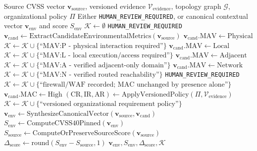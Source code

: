 \begin{algorithm}[H]
\caption{Evidence-Grounded CVSS v4.0 Environmental Metric Inference}
\label{alg:metric_inference}
\begin{algorithmic}[1]
\footnotesize
\Require Source CVSS vector $\mathbf{v}_{\text{source}}$, versioned evidence $\mathcal{V}_{\text{evidence}}$, topology graph $\mathcal{G}$, organizational policy $\Pi$
\Ensure Either \texttt{HUMAN\_REVIEW\_REQUIRED}, or canonical contextual vector $\mathbf{v}_{\text{env}}$ and score $S_{\text{env}}$
\State $\mathcal{K} \gets \emptyset$
    \State \Return \texttt{HUMAN\_REVIEW\_REQUIRED}
\EndIf
\State $\mathbf{v}_{\text{cand}} \gets \text{ExtractCandidateEnvironmentalMetrics}(\mathbf{v}_{\text{source}})$
    \State $\mathbf{v}_{\text{cand}}.\text{MAV} \gets \text{Physical}$
    \State $\mathcal{K} \gets \mathcal{K} \cup \{\text{``MAV:P - physical interaction required''}\}$
    \State $\mathbf{v}_{\text{cand}}.\text{MAV} \gets \text{Local}$
    \State $\mathcal{K} \gets \mathcal{K} \cup \{\text{``MAV:L - local execution/access required''}\}$
    \State $\mathbf{v}_{\text{cand}}.\text{MAV} \gets \text{Adjacent}$
    \State $\mathcal{K} \gets \mathcal{K} \cup \{\text{``MAV:A - verified adjacent-only domain''}\}$
    \State $\mathbf{v}_{\text{cand}}.\text{MAV} \gets \text{Network}$
    \State $\mathcal{K} \gets \mathcal{K} \cup \{\text{``MAV:N - verified routed reachability''}\}$
\Else
    \State \Return \texttt{HUMAN\_REVIEW\_REQUIRED}
\EndIf
{}
    \State $\mathcal{K} \gets \mathcal{K} \cup \{\text{``firewall/WAF recorded; MAC unchanged by presence alone''}\}$
\EndIf
{}
    \State $\mathbf{v}_{\text{cand}}.\text{MAC} \gets \text{High}$
\EndIf
{}
    \State $(\text{CR},\text{IR},\text{AR}) \gets \text{ApplyVersionedPolicy}(\Pi, \mathcal{V}_{\text{evidence}})$
    \State $\mathcal{K} \gets \mathcal{K} \cup \{\text{``versioned organizational requirement policy''}\}$
\EndIf
\State $\mathbf{v}_{\text{env}} \gets \text{SynthesizeCanonicalVector}(\mathbf{v}_{\text{source}}, \mathbf{v}_{\text{cand}})$
\State $S_{\text{env}} \gets \text{ComputeCVSS40Pinned}(\mathbf{v}_{\text{env}})$
\State $S_{\text{source}} \gets \text{ComputeOrPreserveSourceScore}(\mathbf{v}_{\text{source}})$
\State $\Delta_{\text{score}} \gets \text{round}(S_{\text{env}} - S_{\text{source}}, 1)$
\State \Return $\mathbf{v}_{\text{env}}, S_{\text{env}}, \Delta_{\text{score}}, \mathcal{K}$
\end{algorithmic}
\end{algorithm}

